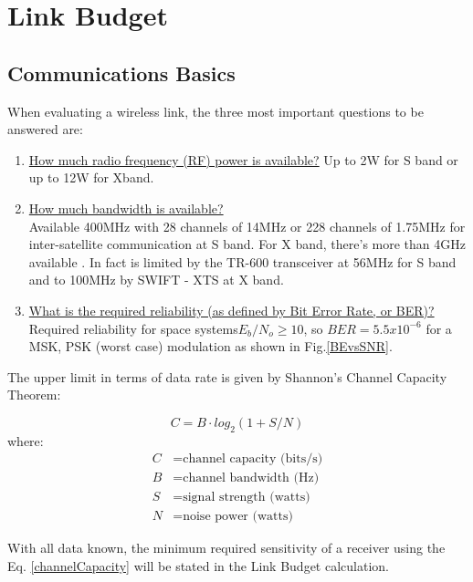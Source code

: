 \section{Link Budget} \label{Appendix:LinkBudget}

\subsection{Communications Basics}
When evaluating a wireless link, the three most important questions to be answered are: \cite{Note1998}\\

\begin{enumerate}
	\item \underline{How much radio frequency (RF) power is available?}
	Up to 2W for S band or up to 12W for Xband.
	\item \underline{How much bandwidth is available?}\\

Available 400MHz with 28 channels of 14MHz or 228 channels of 1.75MHz for inter-satellite communication at S band. For X band, there's more than 4GHz available \cite{SecretariadeEstadodetelecomunicacionesyparalasociedaddelainformacion.2015}. In fact is limited by the TR-600 transceiver at 56MHz for S band and to 100MHz by SWIFT - XTS at X band.
	\item \underline{What is the required reliability (as defined by Bit Error Rate, or BER)?}\\
	
Required reliability for space systems$E_b/N_o \geq 10$, so $BER=5.5x10^{-6}$ for a MSK, PSK (worst case) modulation as shown in Fig.\ref{BEvsSNR}.
\end{enumerate}

The upper limit in terms of data rate is given by Shannon's Channel Capacity Theorem:

\begin{equation}
	C=B\cdot log_2(1+S/N)
	\label{channelCapacity}
\end{equation}
where:
\begin{align*}
	C&= \text{channel capacity (bits/s)}\\
	B&= \text{channel bandwidth (Hz)}\\
	S&= \text{signal strength (watts)}\\
	N&= \text{noise power (watts)}
\end{align*}

With all data known, the minimum required sensitivity of a receiver using the Eq. \ref{channelCapacity} will be stated in the Link Budget calculation.

